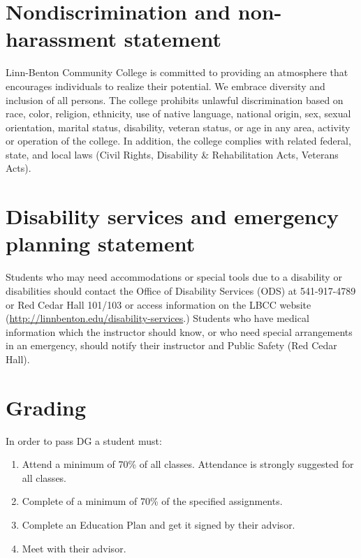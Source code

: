 \documentclass[12pt,article,oneside]{memoir}
\begin{document}
\section{Nondiscrimination and non-harassment statement}

Linn-Benton Community College is committed to providing an atmosphere that  encourages individuals to realize their potential. We embrace diversity and inclusion of all persons. The college prohibits unlawful discrimination based on race, color, religion, ethnicity, use of native language, national origin, sex, sexual orientation, marital status, disability, veteran status, or age in any area, activity or operation of the college. In addition, the college complies with related federal, state, and local laws (Civil Rights, Disability \& Rehabilitation Acts, Veterans Acts).

\section{Disability services and emergency planning statement}

Students who may need accommodations or special tools due to a disability or disabilities should contact the Office of Disability Services (ODS) at 541-917-4789 or Red Cedar Hall 101/103 or access information on the LBCC website (\url{http://linnbenton.edu/disability-services}.) Students who have medical information which the instructor should know, or who need special arrangements in an emergency, should notify their instructor and Public Safety (Red Cedar Hall).

\section{Grading}

In order to pass DG a student must:

\begin{enumerate}
 \item Attend a minimum of 70\% of all classes.  Attendance is strongly suggested for all classes.
 \item Complete of a minimum of 70\% of the specified assignments.
 \item Complete an Education Plan and get it signed by their advisor.
 \item Meet with their advisor.
\end{enumerate}
  
\end{document}
